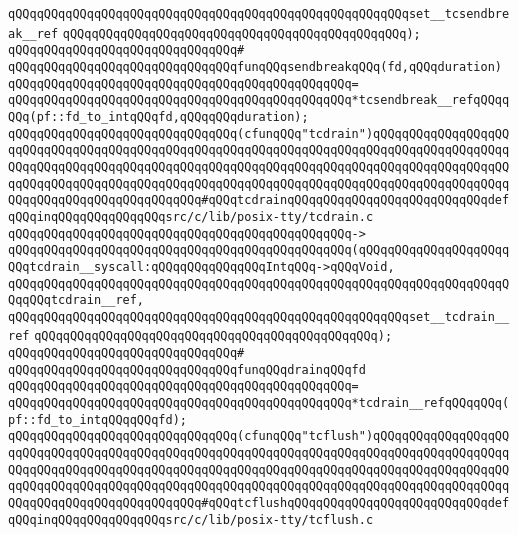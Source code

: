 \verb|qQQqqQQqqQQqqQQqqQQqqQQqqQQqqQQqqQQqqQQqqQQqqQQqqQQqqQQqset__tcsendbreak__ref|\newline
\verb|qQQqqQQqqQQqqQQqqQQqqQQqqQQqqQQqqQQqqQQqqQQqqQQq);|\newline
\verb|qQQqqQQqqQQqqQQqqQQqqQQqqQQqqQQq#|\newline
\verb|qQQqqQQqqQQqqQQqqQQqqQQqqQQqqQQqfunqQQqsendbreakqQQq(fd,qQQqduration)|\newline
\verb|qQQqqQQqqQQqqQQqqQQqqQQqqQQqqQQqqQQqqQQqqQQqqQQq=|\newline
\verb|qQQqqQQqqQQqqQQqqQQqqQQqqQQqqQQqqQQqqQQqqQQqqQQq*tcsendbreak__refqQQqqQQq(pf::fd_to_intqQQqfd,qQQqqQQqduration);|\newline
\newline
\newline
\verb|qQQqqQQqqQQqqQQqqQQqqQQqqQQqqQQq(cfunqQQq"tcdrain")qQQqqQQqqQQqqQQqqQQqqQQqqQQqqQQqqQQqqQQqqQQqqQQqqQQqqQQqqQQqqQQqqQQqqQQqqQQqqQQqqQQqqQQqqQQqqQQqqQQqqQQqqQQqqQQqqQQqqQQqqQQqqQQqqQQqqQQqqQQqqQQqqQQqqQQqqQQqqQQqqQQqqQQqqQQqqQQqqQQqqQQqqQQqqQQqqQQqqQQqqQQqqQQqqQQqqQQqqQQqqQQqqQQqqQQqqQQqqQQqqQQqqQQqqQQqqQQq#qQQqtcdrainqQQqqQQqqQQqqQQqqQQqqQQqqQQqdefqQQqinqQQqqQQqqQQqqQQqsrc/c/lib/posix-tty/tcdrain.c|\newline
\verb|qQQqqQQqqQQqqQQqqQQqqQQqqQQqqQQqqQQqqQQqqQQqqQQq->|\newline
\verb|qQQqqQQqqQQqqQQqqQQqqQQqqQQqqQQqqQQqqQQqqQQqqQQq(qQQqqQQqqQQqqQQqqQQqqQQqtcdrain__syscall:qQQqqQQqqQQqqQQqIntqQQq->qQQqVoid,|\newline
\verb|qQQqqQQqqQQqqQQqqQQqqQQqqQQqqQQqqQQqqQQqqQQqqQQqqQQqqQQqqQQqqQQqqQQqqQQqqQQqtcdrain__ref,|\newline
\verb|qQQqqQQqqQQqqQQqqQQqqQQqqQQqqQQqqQQqqQQqqQQqqQQqqQQqqQQqset__tcdrain__ref|\newline
\verb|qQQqqQQqqQQqqQQqqQQqqQQqqQQqqQQqqQQqqQQqqQQqqQQq);|\newline
\verb|qQQqqQQqqQQqqQQqqQQqqQQqqQQqqQQq#|\newline
\verb|qQQqqQQqqQQqqQQqqQQqqQQqqQQqqQQqfunqQQqdrainqQQqfd|\newline
\verb|qQQqqQQqqQQqqQQqqQQqqQQqqQQqqQQqqQQqqQQqqQQqqQQq=|\newline
\verb|qQQqqQQqqQQqqQQqqQQqqQQqqQQqqQQqqQQqqQQqqQQqqQQq*tcdrain__refqQQqqQQq(pf::fd_to_intqQQqqQQqfd);|\newline
\newline
\newline
\verb|qQQqqQQqqQQqqQQqqQQqqQQqqQQqqQQq(cfunqQQq"tcflush")qQQqqQQqqQQqqQQqqQQqqQQqqQQqqQQqqQQqqQQqqQQqqQQqqQQqqQQqqQQqqQQqqQQqqQQqqQQqqQQqqQQqqQQqqQQqqQQqqQQqqQQqqQQqqQQqqQQqqQQqqQQqqQQqqQQqqQQqqQQqqQQqqQQqqQQqqQQqqQQqqQQqqQQqqQQqqQQqqQQqqQQqqQQqqQQqqQQqqQQqqQQqqQQqqQQqqQQqqQQqqQQqqQQqqQQqqQQqqQQqqQQqqQQqqQQqqQQq#qQQqtcflushqQQqqQQqqQQqqQQqqQQqqQQqqQQqdefqQQqinqQQqqQQqqQQqqQQqsrc/c/lib/posix-tty/tcflush.c|\newline
